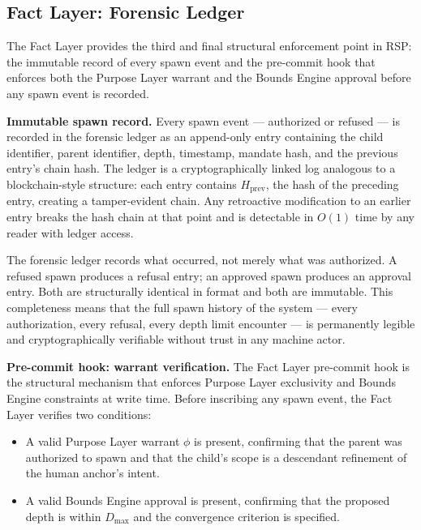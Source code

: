 \subsection{Fact Layer: Forensic Ledger}
\label{sec:fact_layer_ledger}

The Fact Layer provides the third and final structural enforcement point in RSP: the immutable record of every spawn event and the pre-commit hook that enforces both the Purpose Layer warrant and the Bounds Engine approval before any spawn event is recorded.

\medskip
\noindent\textbf{Immutable spawn record.} Every spawn event --- authorized or refused --- is recorded in the forensic ledger as an append-only entry containing the child identifier, parent identifier, depth, timestamp, mandate hash, and the previous entry's chain hash. The ledger is a cryptographically linked log analogous to a blockchain-style structure: each entry contains $H_{\mathrm{prev}}$, the hash of the preceding entry, creating a tamper-evident chain. Any retroactive modification to an earlier entry breaks the hash chain at that point and is detectable in $O(1)$ time by any reader with ledger access.

The forensic ledger records what occurred, not merely what was authorized. A refused spawn produces a refusal entry; an approved spawn produces an approval entry. Both are structurally identical in format and both are immutable. This completeness means that the full spawn history of the system --- every authorization, every refusal, every depth limit encounter --- is permanently legible and cryptographically verifiable without trust in any machine actor.

\medskip
\noindent\textbf{Pre-commit hook: warrant verification.} The Fact Layer pre-commit hook is the structural mechanism that enforces Purpose Layer exclusivity and Bounds Engine constraints at write time. Before inscribing any spawn event, the Fact Layer verifies two conditions:

\begin{itemize}
\item[(PH1)] A valid Purpose Layer warrant $\phi$ is present, confirming that the parent was authorized to spawn and that the child's scope is a descendant refinement of the human anchor's intent.
\item[(PH2)] A valid Bounds Engine approval is present, confirming that the proposed depth is within $D_{\max}$ and the convergence criterion is specified.
\end{itemize}

